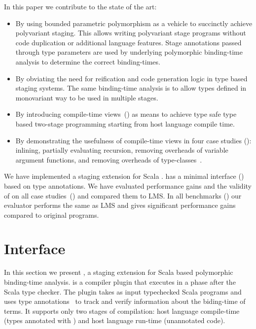 In this paper we contribute to the state of the art:
\begin{itemize}
 \item By using bounded parametric polymorphism as a vehicle to succinctly
   achieve polyvariant staging. This allows writing polyvariant stage programs
   without code duplication or additional language features. Stage annotations
   passed through type parameters are used by underlying polymorphic binding-time
   analysis to determine the correct binding-times.

 \item By obviating the need for reification and code generation logic in type based staging systems. The same binding-time
   analysis is to allow types defined in monovariant way to be used in multiple stages.

 \item By introducing compile-time views~() as means to achieve
  type safe type based two-stage programming starting from host language compile time.

 \item By demonstrating the usefulness of compile-time views in four case
  studies (): inlining, partially evaluating recursion,
  removing overheads of variable argument functions, and removing overheads of
  type-classes~\cite{wadler1989make,hall_type_1996,oliveira_type_2010}.

\end{itemize}

We have implemented a staging extension for Scala \ct.
 \ct has a minimal interface () based on type annotations.
 We have evaluated performance gains and the validity of \ct on all case
 studies~() and compared them to LMS. In all benchmarks ()
 our evaluator performs the same as LMS and gives significant performance gains compared to original programs.


\section{\ct Interface}
\label{sct:interface}

In this section we present \ct, a staging extension for Scala based polymorphic binding-time analysis.
 \ct is a compiler plugin that executes in a phase after the
 Scala type checker. The plugin takes as input typechecked Scala programs and uses
 type annotations~\cite{odersky_1996_putting} to track and verify information about the biding-time
 of terms. It supports only two stages of compilation: host language compile-time
 (types annotated with ) and host language run-time (unannotated code).

